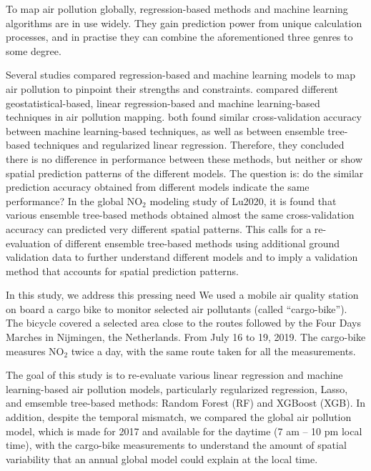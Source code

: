 \documentclass{article}
\begin{document}
\par
To map air pollution globally, regression-based methods and machine learning algorithms are in use widely. They gain prediction power from unique calculation processes, and in practise they can combine the aforementioned three genres to some degree.
\par
Several studies compared regression-based and machine learning models to map air pollution to pinpoint their strengths and constraints. \cite{chen2019comparison, kerckhoffs2019performance, adam2014spatiotemporal, DEHOOGH2014382} compared different geostatistical-based, linear regression-based and machine learning-based techniques in air pollution mapping. \cite{chen2019comparison, kerckhoffs2019performance} both found similar cross-validation accuracy between machine learning-based techniques, as well as between ensemble tree-based techniques and regularized linear regression. Therefore, they concluded there is no difference in performance between these methods, but neither \cite{chen2019comparison} or\cite{kerckhoffs2019performance} show spatial prediction patterns of the different models. The question is: do the similar prediction accuracy obtained from different models indicate the same performance? In the global NO$_2$ modeling study of Lu2020, it is found that various ensemble tree-based methods obtained almost the same cross-validation accuracy can predicted very different spatial patterns. This calls for a re-evaluation of different ensemble tree-based methods using additional ground validation data to further understand different models and to imply a validation method that accounts for spatial prediction patterns. 

\par
In this study, we address this pressing need  We used a mobile air quality station on board a cargo bike to monitor selected air pollutants (called “cargo-bike”). The bicycle covered a selected area close to the routes followed by the Four Days Marches in Nijmingen, the Netherlands.  From July 16 to 19, 2019. The cargo-bike measures NO$_2$ twice a day, with the same route taken for all the measurements.  

\par
The goal of this study is to re-evaluate various linear regression and machine learning-based air pollution models, particularly regularized regression, Lasso, and emsemble tree-based methods: Random Forest (RF) and XGBoost (XGB). In addition, despite the temporal mismatch, we compared the global air pollution model, which is made for 2017 and available for the daytime  (7 am – 10 pm local time), with the cargo-bike measurements to understand the amount of spatial variability that an annual global model could explain at the local time.  
\end{document}
